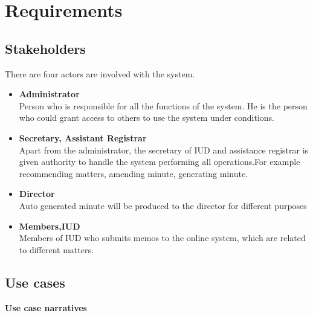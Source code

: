\documentclass[a4paper,beamer]{article}
\begin{document}
	\newpage
	
	\section{Requirements}
	
	\subsection{Stakeholders}
	There are four actors are involved with the system.\newline
	
	\begin{itemize}
	\item\textbf{Administrator} \\
		Person who is responsible for all the functions of the system. He is the person who could grant access to others to use the system under conditions.
	\item\textbf{Secretary, Assistant Registrar} \\
		Apart from the administrator, the secretary of IUD and assistance registrar is given authority to handle the system performing all operations.For example recommending matters, amending minute, generating minute.
	\item\textbf{Director}\\
		Auto generated minute will be produced to the director for different purposes 
	\item\textbf{Members,IUD}\\
		Members of IUD who submits memos to the online system, which are related to different matters.
	\end{itemize}
	
	\subsection{Use cases}
	
		\textbf{Use case narratives}\\

		\bgroup
			\def\arraystretch{2}%
		
\end{document}

